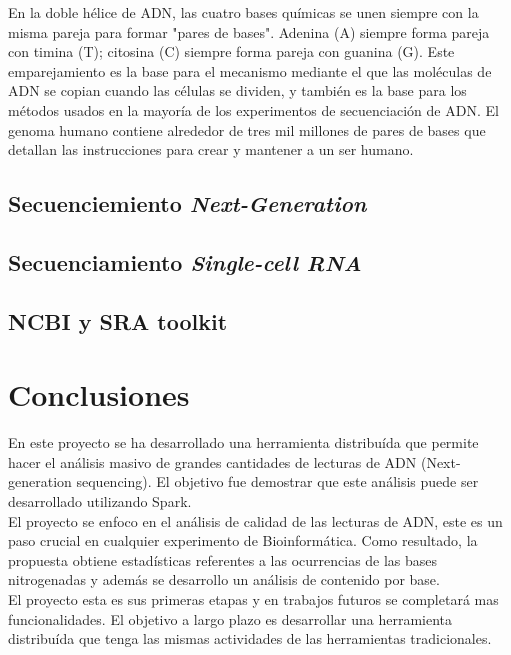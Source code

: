 \documentclass{article}
\begin{document}
En la doble hélice de ADN, las cuatro bases químicas se unen siempre con la misma pareja para formar "pares de bases". Adenina (A) siempre forma pareja con timina (T); citosina (C) siempre forma pareja con guanina (G). Este emparejamiento es la base para el mecanismo mediante el que las moléculas de ADN se copian cuando las células se dividen, y también es la base para los métodos usados en la mayoría de los experimentos de secuenciación de ADN. El genoma humano contiene alrededor de tres mil millones de pares de bases que detallan las instrucciones para crear y mantener a un ser humano.

\subsection{Secuenciemiento \textit{Next-Generation}}

\subsection{ Secuenciamiento \textit{Single-cell RNA}}

\subsection{NCBI y SRA toolkit}
	




\section{Conclusiones}

En este proyecto se ha desarrollado una herramienta distribuída que permite hacer el análisis masivo de grandes cantidades de lecturas de ADN (Next-generation sequencing). El objetivo fue demostrar que este análisis puede ser desarrollado utilizando Spark. \\

El proyecto se enfoco en el análisis de calidad de las lecturas de ADN, este es un paso crucial en cualquier experimento de Bioinformática. Como resultado, la propuesta obtiene estadísticas referentes a las ocurrencias de las bases nitrogenadas y además se desarrollo un análisis de contenido por base. \\
	
El proyecto esta es sus primeras etapas y en trabajos futuros se completará mas funcionalidades. El objetivo a largo plazo es desarrollar una herramienta distribuída que tenga las mismas actividades de las herramientas tradicionales.


%


	
	
	
	
\end{document}
